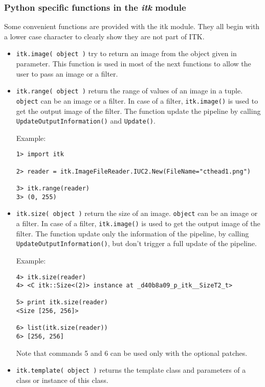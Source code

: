 \documentclass{InsightArticle}
\begin{document}
     \subsubsection{Python specific functions in the {\em itk} module}

Some convenient functions are provided with the itk module. They all begin with a lower
case character to clearly show they are not part of ITK.
\begin{itemize}
  \item \verb$itk.image( object )$ try to return an image from the object given in
parameter. This function is used in most of the next functions to allow the user to
pass an image or a filter.

  \item \verb$itk.range( object )$ return the range of values of an image in a tuple.
\verb$object$ can be an image or a filter. In case of a filter, \verb$itk.image()$ is used
to get the output image of the filter. The function update the pipeline by calling
\verb$UpdateOutputInformation()$ and \verb$Update()$.

Example:
\begin{verbatim}
1> import itk

2> reader = itk.ImageFileReader.IUC2.New(FileName="cthead1.png")

3> itk.range(reader)
3> (0, 255)
\end{verbatim}


  \item \verb$itk.size( object )$ return the size of an image.
\verb$object$ can be an image or a filter. In case of a filter, \verb$itk.image()$ is used
to get the output image of the filter. The function update only the information of the
pipeline, by calling \verb$UpdateOutputInformation()$, but don't trigger a full update
of the pipeline.

Example:
\begin{verbatim}
4> itk.size(reader)
4> <C itk::Size<(2)> instance at _d40b8a09_p_itk__SizeT2_t>

5> print itk.size(reader)
<Size [256, 256]>

6> list(itk.size(reader))
6> [256, 256]
\end{verbatim}
Note that commands 5 and 6 can be used only with the optional patches.

  \item \verb$itk.template( object )$ returns the template class and parameters
of a class or instance of this class.


\end{itemize}
\end{document}
